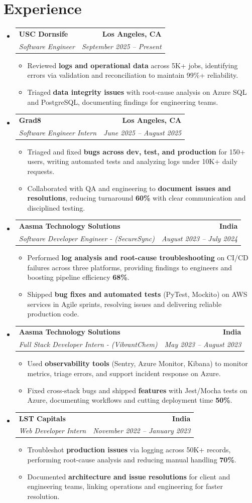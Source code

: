 \documentclass[letterpaper,10pt]{article}
\makeatletter
\newcommand{\resumeItem}[1]{\item\small{{#1 \vspace{-2pt}}}}
\newcommand{\resumeSubheading}[4]{\vspace{-1pt}\item\begin{tabular*}{1.0\textwidth}[t]{l@{\extracolsep{\fill}}r}\textbf{#1} & \textbf{\small #2} \\\textit{\small#3} & \textit{\small #4} \\\end{tabular*}\vspace{-2pt}}
\newcommand{\resumeSubHeadingListStart}{\begin{itemize}[leftmargin=0.0in, label={}]}
\newcommand{\resumeSubHeadingListEnd}{\end{itemize}}
\newcommand{\resumeItemListStart}{\begin{itemize}[leftmargin=0.15in,label=\textbullet,itemsep=2pt,topsep=0pt,parsep=0pt,partopsep=0pt]}
\newcommand{\resumeItemListEnd}{\end{itemize}\vspace{-4pt}}
\makeatother
\begin{document}
\section{Experience}
\resumeSubHeadingListStart
\resumeSubheading{USC Dornsife}{Los Angeles, CA}{Software Engineer}{September 2025 -- Present}
\resumeItemListStart
\resumeItem{Reviewed \textbf{logs and operational data} across 5K+ jobs, identifying errors via validation and reconciliation to maintain 99\%+ reliability.}
\resumeItem{Triaged \textbf{data integrity issues} with root-cause analysis on Azure SQL and PostgreSQL, documenting findings for engineering teams.}
\resumeItemListEnd
\resumeSubheading{Grad8}{Los Angeles, CA}{Software Engineer Intern}{June 2025 -- August 2025}
\resumeItemListStart
\resumeItem{Triaged and fixed \textbf{bugs across dev, test, and production} for 150+ users, writing automated tests and analyzing logs under 10K+ daily requests.}
\resumeItem{Collaborated with QA and engineering to \textbf{document issues and resolutions}, reducing turnaround \textbf{60\%} with clear communication and disciplined testing.}
\resumeItemListEnd
\resumeSubheading{Aasma Technology Solutions}{India}{Software Developer Engineer - (SecureSync)}{August 2023 -- July 2024}
\resumeItemListStart
\resumeItem{Performed \textbf{log analysis and root-cause troubleshooting} on CI/CD failures across three platforms, providing findings to engineers and boosting pipeline efficiency \textbf{68\%}.}
\resumeItem{Shipped \textbf{bug fixes and automated tests} (PyTest, Mockito) on AWS services in Agile sprints, resolving issues and delivering reliable production code.}
\resumeItemListEnd
\resumeSubheading{Aasma Technology Solutions}{India}{Full Stack Developer Intern - (VibrantChem)}{May 2023 -- August 2023}
\resumeItemListStart
\resumeItem{Used \textbf{observability tools} (Sentry, Azure Monitor, Kibana) to monitor metrics, triage errors, and support incident response on Azure.}
\resumeItem{Fixed cross-stack bugs and shipped \textbf{features} with Jest/Mocha tests on Azure, documenting workflows and cutting deployment time \textbf{50\%}.}
\resumeItemListEnd
\resumeSubheading{LST Capitals}{India}{Web Developer Intern}{November 2022 -- January 2023}
\resumeItemListStart
\resumeItem{Troubleshot \textbf{production issues} via logging across 50K+ records, performing root-cause analysis and reducing manual handling \textbf{70\%}.}
\resumeItem{Documented \textbf{architecture and issue resolutions} for client and engineering teams, linking operations and engineering for faster resolution.}
\resumeItemListEnd
\resumeSubHeadingListEnd
\vspace{-6pt}
\end{document}
